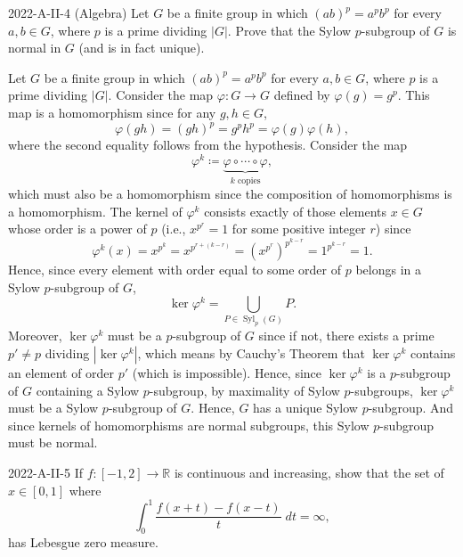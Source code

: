 \documentclass{article}
\begin{document}
\begin{prb}{2022-A-II-4 (Algebra)}
	Let $G$ be a finite group in which $(ab)^{p} = a^{p}b^{p}$ for every $a, b \in G$, where $p$ is a prime dividing $|G|$. Prove that the Sylow $p$-subgroup of $G$ is normal in $G$ (and is in fact unique). 
\end{prb}
\begin{solutions}
	Let $G$ be a finite group in which $(ab)^{p} = a^{p}b^{p}$ for  every $a, b \in G$, where $p$ is a prime dividing $|G|$. Consider the map $\varphi: G \to G$ defined by $\varphi(g)= g^{p}$. This map is a homomorphism since for any $g, h \in G$, 
		\begin{equation}
			\varphi(gh) = (gh)^{p} = g^{p}h^{p} = \varphi(g)\varphi(h), 
		\end{equation}
	where the second equality follows from the hypothesis. Consider the map 
		\begin{equation}
			\varphi^{k} \coloneqq \underbrace{\varphi \circ \dotsm \circ \varphi}_{k \text{ copies}}, 
		\end{equation}
	which must also be a homomorphism since the composition of homomorphisms is a homomorphism. The kernel of $\varphi^{k}$ consists exactly of those elements $x \in G$ whose order is a power of $p$ (i.e., $x^{p^{r}} = 1$ for some positive integer $r$) since 
		\begin{equation}
			\varphi^{k}(x) = x^{p^{k}} = x^{p^{r + (k - r)}} = \left(x^{p^{r}}\right)^{p^{k - r}} = 1^{p^{k - r}} = 1. 
		\end{equation}
	Hence, since every element with order equal to some order of $p$ belongs in a Sylow $p$-subgroup of $G$, 
		\begin{equation}
			\ker{\varphi^{k}} = \bigcup_{P\in \operatorname{Syl}_{p}(G)}P. 
		\end{equation}
	Moreover, $\ker{\varphi^{k}}$ must be a $p$-subgroup of $G$ since if not, there exists a prime $p' \neq p$ dividing $|\ker{\varphi^{k}}|$, which means by Cauchy's Theorem that $\ker{\varphi^{k}}$ contains an element of order $p'$ (which is impossible). Hence, since $\ker{\varphi^{k}}$ is a $p$-subgroup of $G$ containing a Sylow $p$-subgroup, by maximality of Sylow $p$-subgroups, $\ker{\varphi^{k}}$ must be a Sylow $p$-subgroup of $G$. Hence, $G$ has a unique Sylow $p$-subgroup. And since kernels of homomorphisms are normal subgroups, this Sylow $p$-subgroup must be normal. 
\end{solutions}
\begin{prb}{2022-A-II-5}
	If $f: [-1,2] \to \mathbb{R}$ is continuous and increasing, show that the set of $x \in [0,1]$ where 
		\begin{equation*}
			\int_{0}^{1}\frac{f(x + t) - f(x - t)}{t}\;dt = \infty, 
		\end{equation*}
	has Lebesgue zero measure. 
\end{prb}
\end{document}
